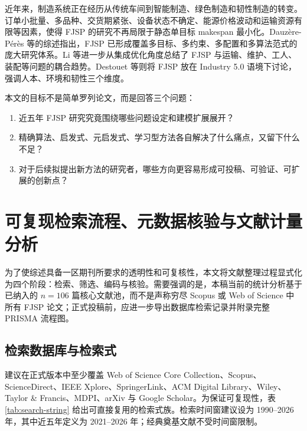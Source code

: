 \documentclass[UTF8,a4paper,11pt]{ctexart}
\begin{document}
近年来，制造系统正在经历从传统车间到智能制造、绿色制造和韧性制造的转变。订单小批量、多品种、交货期紧张、设备状态不确定、能源价格波动和运输资源有限等因素，使得 FJSP 的研究不再局限于静态单目标 makespan 最小化。Dauz\`ere-P\'er\`es 等的综述指出，FJSP 已形成覆盖多目标、多约束、多配置和多算法范式的庞大研究体系\cite{Dauzere-Peres2024}。Li 等进一步从集成优化角度总结了 FJSP 与运输、维护、工人、装配等问题的耦合趋势\cite{Li2022SurveyIntegrated}。Destouet 等则将 FJSP 放在 Industry 5.0 语境下讨论，强调人本、环境和韧性三个维度\cite{Destouet2023Industry5}。

本文的目标不是简单罗列论文，而是回答三个问题：
\begin{enumerate}
    \item 近五年 FJSP 研究究竟围绕哪些问题设定和建模扩展展开？
    \item 精确算法、启发式、元启发式、学习型方法各自解决了什么痛点，又留下什么不足？
    \item 对于后续拟提出新方法的研究者，哪些方向更容易形成可投稿、可验证、可扩展的创新点？
\end{enumerate}


\section{可复现检索流程、元数据核验与文献计量分析}
\label{sec:protocol-bibliometrics}

为了使综述具备一区期刊所要求的透明性和可复核性，本文将文献整理过程显式化为四个阶段：检索、筛选、编码与核验。需要强调的是，本稿当前的统计分析基于已纳入的 $n=106$ 篇核心文献池，而不是声称穷尽 Scopus 或 Web of Science 中所有 FJSP 论文；正式投稿前，应进一步导出数据库检索记录并附录完整 PRISMA 流程图。

\subsection{检索数据库与检索式}

建议在正式版本中至少覆盖 Web of Science Core Collection、Scopus、ScienceDirect、IEEE Xplore、SpringerLink、ACM Digital Library、Wiley、Taylor \& Francis、MDPI、arXiv 与 Google Scholar。为保证可复现性，表\ref{tab:search-string} 给出可直接复用的检索式族。检索时间窗建议设为 1990--2026 年，其中近五年定义为 2021--2026 年；经典奠基文献不受时间窗限制。
\end{document}
